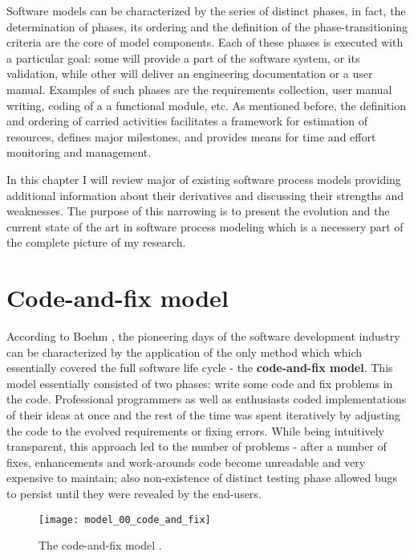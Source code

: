 Software models can be characterized by the series of distinct phases, in fact, the 
determination of phases, its ordering and the definition of the phase-transitioning 
criteria are the core of model components.
Each of these phases is executed with a particular goal: some will provide a part of the 
software system, or its validation, while other will deliver an engineering documentation 
or a user manual. Examples of such phases are the requirements collection, 
user manual writing, coding of a a functional module, etc.
As mentioned before, the definition and ordering of carried activities facilitates
a framework for estimation of resources, defines major milestones, and provides 
means for time and effort monitoring and management. 

In this chapter I will review major of existing software process models providing additional 
information about their derivatives and discussing their strengths and weaknesses.
The purpose of this narrowing is to present the evolution and the current state of the art 
in software process modeling which is a necessery part of the complete picture of my research.

\section{Code-and-fix model}
According to Boehm \cite{citeulike:10002126}, the pioneering days of the software 
development industry can be characterized by the application of the only method which 
which essentially covered the full software life cycle - the \textbf{code-and-fix model}. 
This model essentially consisted of two phases: write some code and fix problems in the code.
Professional programmers as well as enthusiasts coded implementations of their ideas at once 
and the rest of the time was spent iteratively by adjusting the code to the evolved requirements 
or fixing errors. While being intuitively transparent, this approach led to the number of 
problems - after a number of fixes, enhancements and work-arounds 
code become unreadable and very expensive to maintain; also non-existence of
distinct testing phase allowed bugs to persist until they were revealed by the end-users.

\begin{figure}[tbp]
   \centering
   \texttt{[image: model\_00\_code\_and\_fix]}
   \caption{The code-and-fix model \cite{citeulike:10002126}.}
   \label{fig:code_fix_model}
\end{figure}

